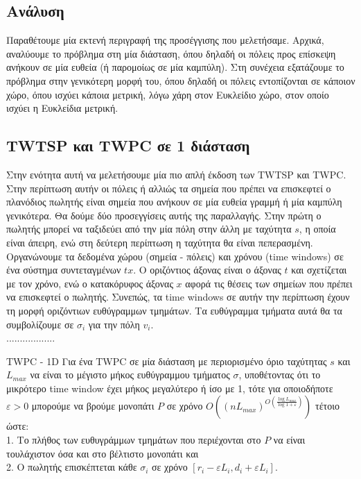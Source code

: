 \documentclass[oneside,12pt]{book}
\theoremstyle{definition}
\begin{document}
\subsection{Ανάλυση}

Παραθέτουμε μία εκτενή περιγραφή της προσέγγισης που μελετήσαμε. Αρχικά, αναλύουμε το πρόβλημα στη μία διάσταση, όπου δηλαδή οι πόλεις προς επίσκεψη ανήκουν σε μία ευθεία (ή παρομοίως σε μία καμπύλη). Στη συνέχεια εξατάζουμε το πρόβλημα στην γενικότερη μορφή του, όπου δηλαδή οι πόλεις εντοπίζονται σε κάποιον χώρο, όπου ισχύει κάποια μετρική, λόγω χάρη στον Ευκλείδιο χώρο, στον οποίο ισχύει η Ευκλείδια μετρική. \\

\subsection{TWTSP και TWPC σε 1 διάσταση}

Στην ενότητα αυτή να μελετήσουμε μία πιο απλή έκδοση των TWTSP και TWPC. Στην περίπτωση αυτήν οι πόλεις ή αλλιώς τα σημεία που πρέπει να επισκεφτεί ο πλανόδιος πωλητής είναι σημεία που ανήκουν σε μία ευθεία γραμμή ή μία καμπύλη γενικότερα. Θα δούμε δύο προσεγγίσεις αυτής της παραλλαγής. Στην πρώτη ο πωλητής μπορεί να ταξιδεύει από την μία πόλη στην άλλη με ταχύτητα \(s\), η οποία είναι άπειρη, ενώ στη δεύτερη περίπτωση η ταχύτητα θα είναι πεπερασμένη. \\

Οργανώνουμε τα δεδομένα χώρου (σημεία - πόλεις) και χρόνου (time windows) σε ένα σύστημα συντεταγμένων \(tx\). Ο οριζόντιος άξονας είναι ο άξονας \(t\) και σχετίζεται με τον χρόνο, ενώ ο κατακόρυφος άξονας \(x\) αφορά τις θέσεις των σημείων που πρέπει να επισκεφτεί ο πωλητής. Συνεπώς, τα time windows σε αυτήν την περίπτωση έχουν τη μορφή οριζόντιων ευθύγραμμων τμημάτων. Τα ευθύγραμμα τμήματα αυτά θα τα συμβολίζουμε σε \(σ_i\) για την πόλη \(v_i\). \\

.................. \\

\begin{mytheorem}{TWPC - 1D}{}
	Για ένα TWPC σε μία διάσταση με περιορισμένο όριο ταχύτητας \(s\) και \(L_{max}\) να είναι το μέγιστο μήκος ευθύγραμμου τμήματος \(σ\), υποθέτοντας ότι το μικρότερο time window έχει μήκος μεγαλύτερο ή ίσο με 1, τότε για οποιοδήποτε \(ε > 0\) μπορούμε να βρούμε μονοπάτι \(P\) σε χρόνο \(Ο((nL_{max})^{O(\frac{\log L_{max}}{\log 1 + ε})})\) τέτοιο ώστε: \\
	1. Το πλήθος των ευθυγράμμων τμημάτων που περιέχονται στο \(P\) να είναι τουλάχιστον όσα και στο βέλτιστο μονοπάτι και \\
	2. Ο πωλητής επισκέπτεται κάθε \(σ_i\) σε χρόνο \([r_i - εL_i, d_i + εL_i]\). 
\end{mytheorem}
\end{document}
